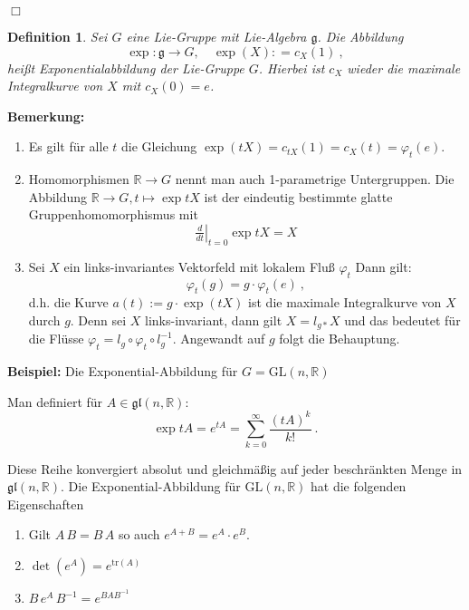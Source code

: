 \documentclass[12pt,a4paper]{article}
\def\R{\mathbb{R}}
\def\GL{\mathrm{GL}}
\def\g{\mathfrak{g}}
\def\tr{\mathrm{tr}}
\def\gl{\mathfrak{gl}}
\newtheorem{Definition}[Lemma]{Definition}
\def\qed{\quad\hfill\ensuremath{\Box}}
\begin{document}
\qed

\bigskip

\begin{Definition}
Sei $G$ eine Lie-Gruppe mit Lie-Algebra $\g$. Die Abbildung
$$
\exp : \g \rightarrow G, \quad \exp(X) : = c_X(1) \ ,
$$
hei\ss t {\em Exponentialabbildung} der Lie-Gruppe $G$. Hierbei ist
$c_X$ wieder die maximale Integralkurve von $X$ mit $c_X(0)=e$.
\end{Definition}


{\bf Bemerkung:}
\begin{enumerate}
\item
Es gilt f\"ur alle $t$ die Gleichung $\exp(tX) = c_{tX}(1) = c_X(t) =  \varphi_t(e)$.
\item
Homomorphismen $\R \rightarrow G$ nennt man auch 1-parametrige Untergruppen.
Die Abbildung $\R\rightarrow G, t\mapsto \exp tX$ ist der eindeutig bestimmte
glatte Gruppenhomomorphismus mit
$$
\left.\tfrac{d}{dt}\right|_{t=0} \exp tX = X
$$
\item
Sei $X$ ein links-invariantes Vektorfeld mit lokalem Flu\ss{} $\varphi_t$
Dann gilt:
$$
\varphi_t(g) = g \cdot \varphi_t(e) \ ,
$$
d.h. die Kurve $a(t):= g\cdot \exp (tX)$ ist die maximale Integralkurve von
$X$ durch $g$.
Denn sei $X$ links-invariant, dann gilt $X= l_{g\ast}X$ und das bedeutet f\"ur
die Fl\"usse $\varphi_t = l_g \circ \varphi_t \circ l_{g}^{-1}$. Angewandt
auf $g$ folgt die Behauptung.
\end{enumerate}

\bigskip

{\bf Beispiel:} Die Exponential-Abbildung f\"ur $G= \GL(n,\R)$

Man definiert f\"ur $A \in \gl(n,\R)$:
$$
\exp t A = e^{tA} = \sum^\infty_{k=0} \frac{(tA)^k}{k!} \ .
$$

Diese Reihe konvergiert absolut und gleichm\"a\ss ig auf jeder beschr\"ankten Menge
in $\gl(n, \R)$. Die Exponential-Abbildung f\"ur $\GL(n,\R)$ hat die folgenden
Eigenschaften

\begin{enumerate}
\item
Gilt $A \, B = B \, A $ so auch $e^{A+B} =e^A \cdot e^B$.
\item
$\det(e^A) = e^{\tr (A)}$
\item
$B \, e^A \, B^{-1} = e^{B A B^{-1}}$
\end{enumerate}

\bigskip
\end{document}
